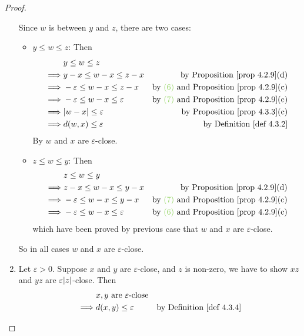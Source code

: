 \begin{proof}
\begin{enumerate}
        Since \(w\) is  between \(y\) and \(z\), there are two cases:
        \begin{itemize}
            \item \(y \le w \le z\):
                Then
                \begin{align*}
                             & y \le w \le z \\
                    \implies & y - x \le w - x \le z - x & \text{by \PROP{4.2.9}(d)} \\
                    \implies & -\varepsilon \le w - x \le z - x & \text{by \GREEN{(6)} and \PROP{4.2.9}(c)} \\
                    \implies & -\varepsilon \le w - x \le \varepsilon & \text{by \GREEN{(7)} and \PROP{4.2.9}(c)} \\
                    \implies & \abs{w - x} \le \varepsilon & \text{by \PROP{4.3.3}(c)} \\
                    \implies & d(w, x) \le \varepsilon & \text{by \DEF{4.3.2}} \\
                \end{align*}
                By  \(w\) and \(x\) are \(\varepsilon\)-close.
            \item \(z \le w \le y\):
                Then
                \begin{align*}
                             & z \le w \le y \\
                    \implies & z - x \le w - x \le y - x & \text{by \PROP{4.2.9}(d)} \\
                    \implies & -\varepsilon \le w - x \le y - x & \text{by \GREEN{(7)} and \PROP{4.2.9}(c)} \\
                    \implies & -\varepsilon \le w - x \le \varepsilon & \text{by \GREEN{(6)} and \PROP{4.2.9}(c)}
                \end{align*}
                which have been proved by previous case that \(w\) and \(x\) are \(\varepsilon\)-close.
        \end{itemize}
        So in all cases \(w\) and \(x\) are \(\varepsilon\)-close.
    \item
        Let \(\varepsilon > 0\).
        Suppose \(x\) and \(y\) are \(\varepsilon\)-close, and \(z\) is non-zero, we have to show \(xz\) and \(yz\) are \(\varepsilon\lvert z\rvert\)-close.
        Then
        \begin{align*}
                     & x, y \text{\ are \(\varepsilon\)-close} \\
            \implies & d(x, y) \le \varepsilon & \text{by \DEF{4.3.4}} \\

\end{align*}
\end{enumerate}
\end{proof}
